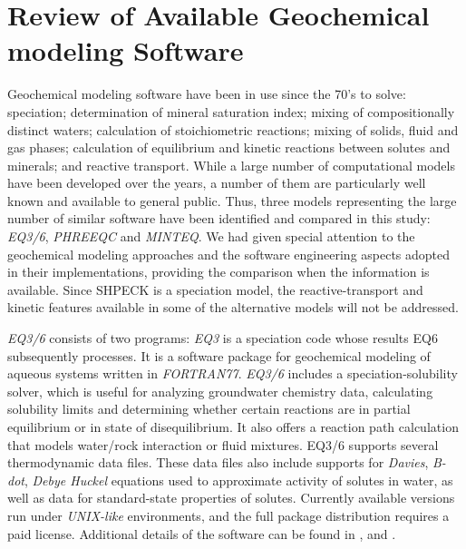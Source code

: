 \documentclass[preprint,12pt,3p]{elsarticle}
\begin{document}
\section{Review of Available Geochemical modeling Software}
Geochemical modeling software have been in use since the 70’s to solve: speciation; determination of mineral saturation index; mixing of compositionally distinct  waters; calculation of stoichiometric reactions; mixing of solids, fluid and gas phases; calculation of equilibrium and kinetic reactions between solutes and minerals; and reactive transport. While a large number of computational models have been developed over the years, a number of them are particularly well known and available to general public. Thus, three models representing the large number of similar software have been identified and compared in this study: \emph{EQ3/6}, \emph{PHREEQC} and \emph{MINTEQ}. We had given special attention to the geochemical modeling approaches and the software engineering aspects adopted in their implementations, providing the comparison when the information is available. Since SHPECK is a speciation model, the reactive-transport and kinetic features available in some of the alternative models will not be addressed.

\emph{EQ3/6} consists of two programs: \emph{EQ3} is a speciation code whose results EQ6 subsequently processes. It is a software package for geochemical modeling of aqueous systems written in \emph{FORTRAN77}. \emph{EQ3/6} includes a speciation-solubility solver, which is useful for analyzing groundwater chemistry data, calculating solubility limits and determining whether certain reactions are in partial equilibrium or in state of disequilibrium. It also offers a reaction path calculation that models water/rock interaction or fluid mixtures. EQ3/6 supports several thermodynamic data files. These data files also include supports for \emph{Davies}, \emph{B-dot}, \emph{Debye Huckel} equations used to approximate activity of solutes in water, as well as data for standard-state properties of solutes. Currently available versions run under \emph{UNIX-like} environments, and the full package distribution requires a paid license. Additional details of the software can be found in \cite{Wolery:1979}, \cite{Wolery:1990} and \cite{Wolery:1992}.
\end{document}
